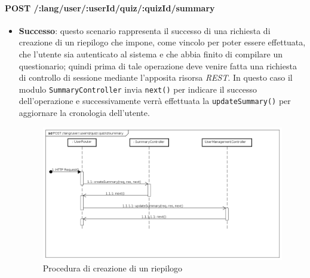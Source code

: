 \paragraph{POST /:lang/user/:userId/quiz/:quizId/summary} %
\begin{itemize}
\item \textbf{Successo}: questo scenario rappresenta il successo di una richiesta di creazione di un riepilogo che impone, come vincolo per poter essere effettuata, che l'utente sia autenticato al sistema e che abbia finito di compilare un questionario; quindi prima di tale operazione deve venire fatta una richiesta di controllo di sessione mediante l'apposita risorsa \textit{REST}. In questo caso il modulo \texttt{SummaryController} invia \texttt{next()} per indicare il successo dell'operazione e successivamente verrà effettuata la \texttt{updateSummary()} per aggiornare la cronologia dell'utente.
\label{Procedura di creazione di un riepilogo}
\begin{figure}[ht]
	\centering
	\includegraphics[scale=0.40]{UML/DiagrammiDiSequenza/Back-end/POST__lang_user_userId_quiz_quizId_summary_success.png}
	\caption{Procedura di creazione di un riepilogo}
\end{figure}
\FloatBarrier


\end{itemize}
